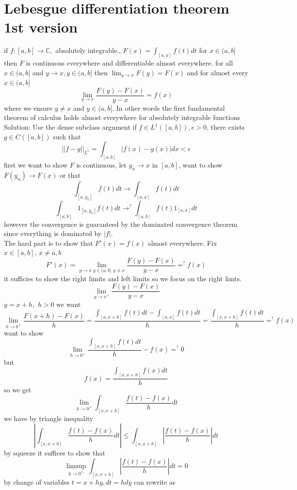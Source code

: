 \documentclass[11pt]{article}
\newcommand{\solution}[1]{{{\textcolor{header}{Solution:} \textcolor{solution}{#1}}}}
\begin{document}
\section{Lebesgue differentiation theorem 1st version}
if $f : [a,b] \rightarrow \mathbb{C}, $ absolutely integrable., $F(x) = \int_{[a,x]}^{}f(t)dt$ for $x \in (a,b]$
then  $F$ is continuous everywhere and differentiable almost everywhere. for all $x \in (a,b]$ and  $y \rightarrow x, y \in (a,b]$ then $\lim_{y\to x}F(y) = F(x)$
and for almost every $x \in (a,b]$
 \[
\lim_{y\to x} \frac{F(y) - F(x)}{y-x} = f(x)
\] 
where we ensure $y \ne x $ and  $y \in (a,b]$. In other words the first fundamental theorem of calculus holds
almost everywhere for absolutely integrable functions
\solution{
    Use the dense subclass argument if $f \in L^{1}([a,b]), \epsilon > 0$, there exists $g \in C([a,b])$ such that
     \[
         ||f-g||_{L^{1}} = \int_{[a,b]}^{}|f(x)-g(x)|dx < \epsilon
    \] 
    first we want to show $F$ is continuous, let $y_n \rightarrow x$ in $[a,b]$, want to show  $F(y_n) \rightarrow F(x)$ or that
    \[
        \int_{[a,y_n]}^{}f(t)dt \rightarrow \int_{[a,x]}^{}f(t)dt
    \] 
    \[
        \int_{[a,b]}^{}1_{[a,y_n]}f(t)dt \rightarrow^{?} \int_{[a,b]}^{}f(t) 1_{[a,x]}dt
    \] 
    however the convergence is guaranteed by the dominated convergence theorem since everything is dominated by $|f|$.
    \\
    The hard part is to show that  $F'(x) = f(x)$ almost everywhere. Fix  $x \in [a,b]$, $x \ne a,b$
     \[
         F'(x) = \lim_{y\to x \; y \in (a,b], y \ne x} \frac{F(y) - F(x)}{y-x}  =^{?} f(x)
    \] 
    it sufficies to show the right limits and left limits so we focus on the right limts.
    \[
    \lim_{y\to x^{+}}\frac{F(y) - F(x)}{y-x}
    \] 
    $y = x + h,$  $h > 0$ we want
     \[
         \lim_{h\to 0^{+}}\frac{F(x+h) - F(x)}{h} = \frac{\int_{[a,x+h]}^{}f(t)dt - \int_{[a,x]}^{}f(t)dt}{h} = \frac{\int_{[x,x+h]}^{}f(t)dt}{h} =^{?} f(x)
    \] 
    want to show 
    \[
        \lim_{h\to 0^{+}}\frac{\int_{[x,x+h]}^{}f(t)dt}{h} - f(x) =^{?} 0
    \] 
    but
    \[
        f(x) = \frac{\int_{[x,x+h]}^{}f(x)dt}{h}
    \] 
    so we get
    \[
        \lim_{h\to 0^{+}} \int_{[x,x+h]}^{}\frac{f(t)-f(x)}{h}dt
    \] 
    we have by triangle inequality
    \[
        |\int_{[x,x+h]}^{}\frac{f(t)-f(x)}{h}dt| \le \int_{[x,x+h]}^{}|\frac{f(t)-f(x)}{h}| dt
    \] 
    by squeeze it suffices to show that
    \[
        \limsup_{h\to 0^{+}} \int_{[x,x+h]}^{}|\frac{f(t)-f(x)}{h}| dt = 0
    \] 
    by change of variables $t = x + hy, dt = hdy$ can rewrite as
}
\end{document}
